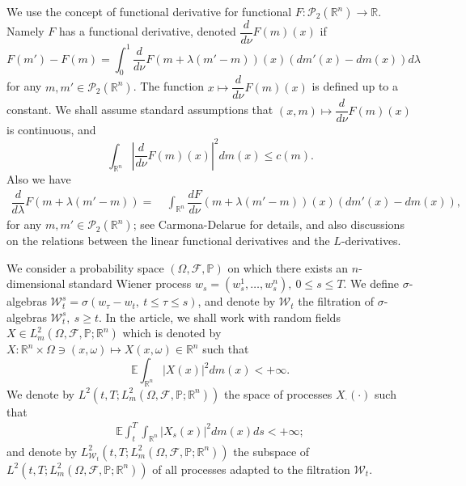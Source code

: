 \documentclass[11pt]{article}
\numberwithin{equation}{section}
\newcommand{\e}{\mathbb{E}}
\newcommand{\br}{\mathbb{R}}
\newcommand{\pr}{\mathcal{P}}
\newcommand{\brn}{{\mathbb{R}^n}}
\newcommand{\1}{\mbox{1\hspace{-1mm}I}}
\begin{document}
We use the concept of functional derivative for functional $F:\pr_2(\brn)\to\br$. Namely $F$ has a functional derivative, denoted $\dfrac{d}{d\nu}F(m)(x)$ if 
\begin{equation*}
    F(m')-F(m)=\int_{0}^{1}\dfrac{d}{d\nu}F\left(m+\lambda(m'-m)\right)(x)\left(dm'(x)-dm(x)\right)d\lambda
\end{equation*}
for any $m,m'\in\pr_2(\brn)$. The function $x\mapsto\dfrac{d}{d\nu}F(m)(x)$ is defined up to a constant. We shall assume standard assumptions that $(x,m)\mapsto\dfrac{d}{d\nu}F(m)(x)$ is continuous, and 
\[
\int_{\brn}\left|\dfrac{d}{d\nu}F(m)(x)\right|^{2}dm(x)\leq c(m).
\]
Also we have 
\begin{align*}
    \dfrac{d}{d\lambda}F\left(m+\lambda(m'-m)\right)=\ & \int_{\brn}\dfrac{dF}{d\nu}\left(m+\lambda(m'-m)\right)(x)\left(dm'(x)-dm(x)\right), 
\end{align*}
for any $m,m'\in\pr_2(\brn)$; see Carmona-Delarue
\cite{book_mfg} for details, and also discussions on the relations between the linear functional derivatives and the $L$-derivatives.


We consider a probability space $(\Omega,\mathcal{F},\mathbb{P})$ on which there exists an $n$-dimensional standard Wiener process $w_s=\left(w^1_s,\dots, w^n_s\right),\ 0\le s\le T$. We define $\sigma$-algebras $\mathcal{W}_{t}^{s}=\sigma\left(w_\tau-w_t,\ t\leq\tau\leq s\right)$, and denote by $\mathcal{W}_{t}$ the filtration of $\sigma$-algebras $\mathcal{W}_{t}^{s},\ s\geq t$. In the article, we shall work with random fields $X\in L_{m}^{2}(\Omega,\mathcal{F},\mathbb{P};\brn)$ which is denoted by $X:\brn\times\Omega\ni(x,\omega)\mapsto X(x,\omega)\in\brn$ such that 
\begin{equation*}
    \e\int_{\brn}\left|X(x)\right|^{2}dm(x)<+\infty.
\end{equation*}
We denote by $L^2\left(t,T;L_{m}^{2}(\Omega,\mathcal{F},\mathbb{P};\brn)\right)$ the space of processes $X_\cdot(\cdot)$ such that
\begin{align*}
    \e\int_{t}^{T}\int_{\brn}|X_s(x)|^{2}dm(x)ds<+\infty;
\end{align*}
and denote by $L^2_{\mathcal{W}_{t}}\left(t,T;L_{m}^{2}(\Omega,\mathcal{F},\mathbb{P};\brn)\right)$ the subspace of $L^2\left(t,T;L_{m}^{2}(\Omega,\mathcal{F},\mathbb{P};\brn)\right)$ of all processes adapted to the filtration $\mathcal{W}_{t}$. 
\end{document}
